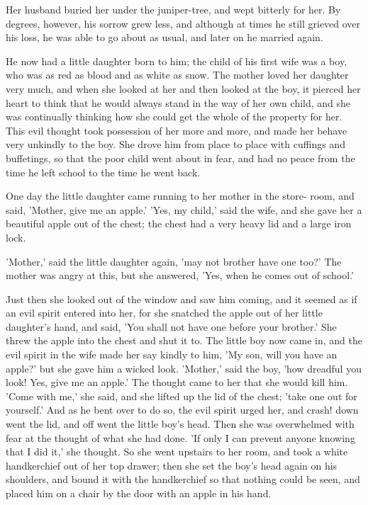 \documentclass[12pt]{book}
\begin{document}
Her husband buried her under the juniper-tree, and wept bitterly for
her. By degrees, however, his sorrow grew less, and although at times
he still grieved over his loss, he was able to go about as usual, and
later on he married again.

He now had a little daughter born to him; the child of his first wife
was a boy, who was as red as blood and as white as snow. The mother
loved her daughter very much, and when she looked at her and then
looked at the boy, it pierced her heart to think that he would always
stand in the way of her own child, and she was continually thinking
how she could get the whole of the property for her. This evil thought
took possession of her more and more, and made her behave very
unkindly to the boy. She drove him from place to place with cuffings
and buffetings, so that the poor child went about in fear, and had no
peace from the time he left school to the time he went back.

One day the little daughter came running to her mother in the store-
room, and said, 'Mother, give me an apple.' 'Yes, my child,' said the
wife, and she gave her a beautiful apple out of the chest; the chest
had a very heavy lid and a large iron lock.

'Mother,' said the little daughter again, 'may not brother have one
too?' The mother was angry at this, but she answered, 'Yes, when he
comes out of school.'

Just then she looked out of the window and saw him coming, and it
seemed as if an evil spirit entered into her, for she snatched the
apple out of her little daughter's hand, and said, 'You shall not have
one before your brother.' She threw the apple into the chest and shut
it to. The little boy now came in, and the evil spirit in the wife
made her say kindly to him, 'My son, will you have an apple?' but she
gave him a wicked look. 'Mother,' said the boy, 'how dreadful you
look! Yes, give me an apple.' The thought came to her that she would
kill him. 'Come with me,' she said, and she lifted up the lid of the
chest; 'take one out for yourself.' And as he bent over to do so, the
evil spirit urged her, and crash! down went the lid, and off went the
little boy's head. Then she was overwhelmed with fear at the thought
of what she had done. 'If only I can prevent anyone knowing that I did
it,' she thought. So she went upstairs to her room, and took a white
handkerchief out of her top drawer; then she set the boy's head again
on his shoulders, and bound it with the handkerchief so that nothing
could be seen, and placed him on a chair by the door with an apple in
his hand.
\end{document}
